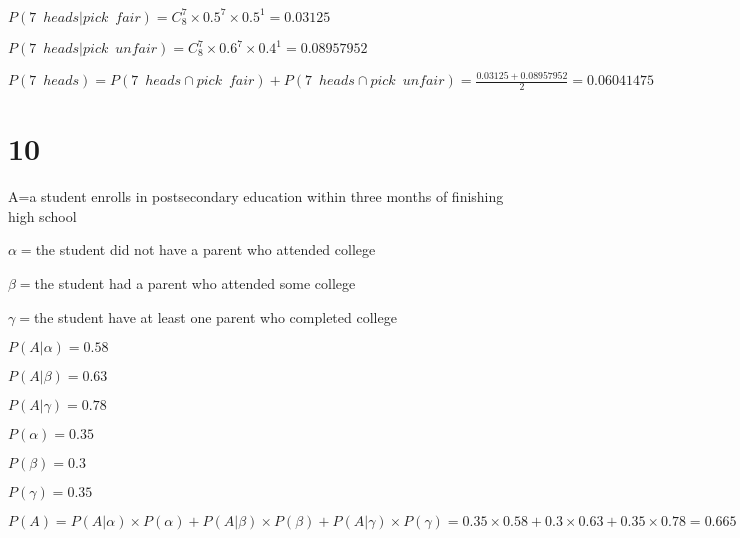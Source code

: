 \documentclass{article}
\begin{document}
	$P(7\enspace heads|pick\enspace fair)=C_8^7\times 0.5^7\times 0.5^1=0.03125$
	
	$P(7\enspace heads|pick\enspace unfair)=C_8^7\times 0.6^7\times 0.4^1=0.08957952$
	
	$P(7\enspace heads)=P(7\enspace heads\cap pick\enspace fair)+P(7\enspace heads\cap pick\enspace unfair)=\frac{0.03125+0.08957952}{2}=0.06041475$
		
	\section*{10}	
	
	A=a student enrolls in postsecondary
education within three months of finishing high school
	
	$\alpha=$the student did not have a parent who attended college
	
	$\beta=$the student had a parent who attended some college
	
	$\gamma=$the student have at least one parent who completed college
	
	$P(A|\alpha)=0.58$

	$P(A|\beta)=0.63$
	
	$P(A|\gamma)=0.78$
	
	$P(\alpha)=0.35$
	
	$P(\beta)=0.3$
	
	$P(\gamma)=0.35$
	
	$P(A)=P(A|\alpha)\times P(\alpha)+P(A|\beta)\times P(\beta)+P(A|\gamma)\times P(\gamma)=0.35\times 0.58+0.3\times 0.63+0.35\times 0.78=0.665$
	
\end{document}
